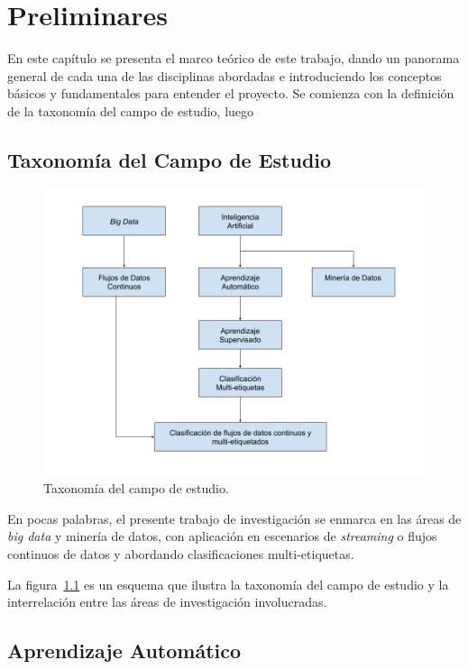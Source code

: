 \chapter{Preliminares}


En este capítulo se presenta el marco teórico de este trabajo, dando un panorama
general de cada una de las disciplinas abordadas e introduciendo los conceptos
básicos y fundamentales para entender el proyecto. Se comienza con la definición
de la taxonomía del campo de estudio, luego 

\section{Taxonomía del Campo de Estudio}

\begin{figure}
	\includegraphics[width=.9\linewidth]{figures/study_field_taxonomy_v2.png}
	\centering
	\caption{Taxonomía del campo de estudio.}
	\label{fig:campo_estudio}
\end{figure}

En pocas palabras, el presente trabajo de investigación se enmarca en las áreas
de \textit{big data} y minería de datos, con aplicación en escenarios de
\textit{streaming} o flujos continuos de datos y abordando clasificaciones
multi-etiquetas.

La figura~\ref{fig:campo_estudio} es un esquema que ilustra la taxonomía del
campo de estudio y la interrelación entre las áreas de investigación
involucradas.

\section{Aprendizaje Automático}

